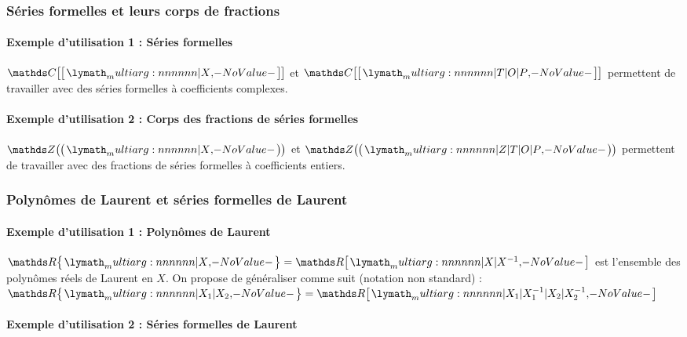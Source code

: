 \documentclass[12pt,a4paper]{article}
\theoremstyle{definition}
\begin{document}
        \subsubsection{Séries formelles et leurs corps de fractions}

            \paragraph{Exemple d'utilisation 1 : Séries formelles}

\begin{tcblisting}{}
$\serieset{\CC}{X}$ et $\serieset{\CC}{T | O | P}$ permettent de travailler avec des
séries formelles à coefficients complexes.
\end{tcblisting}



            \paragraph{Exemple d'utilisation 2 : Corps des fractions de séries formelles}

\begin{tcblisting}{}
$\seriefracset{\ZZ}{X}$ et $\seriefracset{\ZZ}{Z | T | O | P}$ permettent de travailler
avec des fractions de séries formelles à coefficients entiers.
\end{tcblisting}



        \subsubsection{Polynômes de Laurent et séries formelles de Laurent}

            \paragraph{Exemple d'utilisation 1 : Polynômes de Laurent}

\begin{tcblisting}{}
$\polylaurentset{\RR}{X} = \polyset{\RR}{X | X^{-1}}$ est l'ensemble des polynômes
réels de Laurent en $X$. On propose de généraliser comme suit (notation non standard) :
$\polylaurentset{\RR}{X_1 | X_2} = \polyset{\RR}{X_1 | X_1^{-1} | X_2 | X_2^{-1}}$
\end{tcblisting}



            \paragraph{Exemple d'utilisation 2 : Séries formelles de Laurent}
\end{document}
